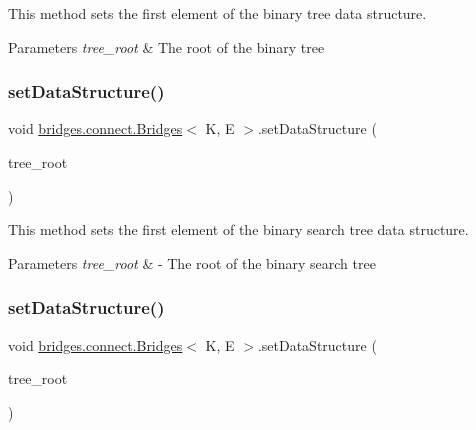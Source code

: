 This method sets the first element of the binary tree data structure.


\begin{DoxyParams}{Parameters}
{\em tree\+\_\+root} & The root of the binary tree \\
\hline
\end{DoxyParams}
\hypertarget{classbridges_1_1connect_1_1_bridges_adb01a9385de48ef267bdfd22758fb361}{}\label{classbridges_1_1connect_1_1_bridges_adb01a9385de48ef267bdfd22758fb361} 
\subsubsection{\texorpdfstring{set\+Data\+Structure()}{setDataStructure()}\hspace{0.1cm}{\footnotesize\ttfamily [9/12]}}
{\footnotesize\ttfamily void \hyperlink{classbridges_1_1connect_1_1_bridges}{bridges.\+connect.\+Bridges}$<$ K, E $>$.set\+Data\+Structure (\begin{DoxyParamCaption}\item[{\hyperlink{classbridges_1_1base_1_1_b_s_t_element}{B\+S\+T\+Element}$<$ K, E $>$}]{tree\+\_\+root }\end{DoxyParamCaption})}

This method sets the first element of the binary search tree data structure.


\begin{DoxyParams}{Parameters}
{\em tree\+\_\+root} & -\/ The root of the binary search tree \\
\hline
\end{DoxyParams}
\hypertarget{classbridges_1_1connect_1_1_bridges_a702c3f88840e100ad0182110627e60f5}{}\label{classbridges_1_1connect_1_1_bridges_a702c3f88840e100ad0182110627e60f5} 
\subsubsection{\texorpdfstring{set\+Data\+Structure()}{setDataStructure()}\hspace{0.1cm}{\footnotesize\ttfamily [10/12]}}
{\footnotesize\ttfamily void \hyperlink{classbridges_1_1connect_1_1_bridges}{bridges.\+connect.\+Bridges}$<$ K, E $>$.set\+Data\+Structure (\begin{DoxyParamCaption}\item[{\hyperlink{classbridges_1_1base_1_1_a_v_l_tree_element}{A\+V\+L\+Tree\+Element}$<$ K, E $>$}]{tree\+\_\+root }\end{DoxyParamCaption})}


